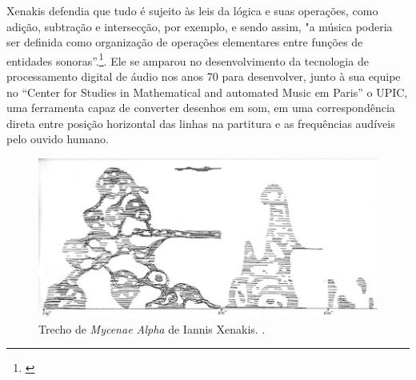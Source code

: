 Xenakis defendia que tudo é sujeito às leis da lógica e suas operações, como adição, subtração e intersecção, por exemplo, e sendo assim, "a música poderia ser definida como organização de operações elementares entre funções de entidades sonoras”.\footnote{\cite[p. 21]{Xenakis1971}}. Ele se amparou no desenvolvimento da tecnologia de processamento digital de áudio nos anos 70 para desenvolver, junto à sua equipe no ``Center for Studies in Mathematical and automated Music em Paris'' o UPIC, uma ferramenta capaz de converter desenhos em som, em uma correspondência direta entre posição horizontal das linhas na partitura e as frequências audíveis pelo ouvido humano.


\begin{figure}
    \caption{\label{xenakis}Trecho de \textit{Mycenae Alpha} de Iannis Xenakis.
.}
    
        \includegraphics[width=1\linewidth]{pictures/cap2/metastasis}
    
\end{figure}


    
    


